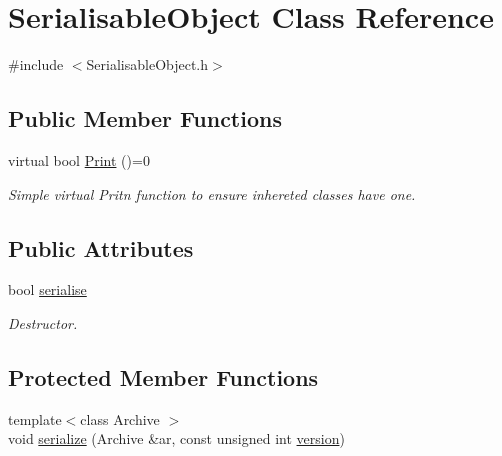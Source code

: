 \hypertarget{classSerialisableObject}{\section{Serialisable\-Object Class Reference}
\label{classSerialisableObject}
}


{\ttfamily \#include $<$Serialisable\-Object.\-h$>$}

\subsection*{Public Member Functions}
\begin{DoxyCompactItemize}
\item 
\hypertarget{classSerialisableObject_a9055c98969917d4c652eefdc924b6b75}{virtual bool \hyperlink{classSerialisableObject_a9055c98969917d4c652eefdc924b6b75}{Print} ()=0}\label{classSerialisableObject_a9055c98969917d4c652eefdc924b6b75}

\begin{DoxyCompactList}\small\item\em Simple virtual Pritn function to ensure inhereted classes have one. \end{DoxyCompactList}\end{DoxyCompactItemize}
\subsection*{Public Attributes}
\begin{DoxyCompactItemize}
\item 
bool \hyperlink{classSerialisableObject_a4635f9e80623df463bcca2c88b10fc67}{serialise}
\begin{DoxyCompactList}\small\item\em Destructor. \end{DoxyCompactList}\end{DoxyCompactItemize}
\subsection*{Protected Member Functions}
\begin{DoxyCompactItemize}
\item 
{\footnotesize template$<$class Archive $>$ }\\void \hyperlink{classSerialisableObject_a7c9ec7bf87b5921957768f4467c6143a}{serialize} (Archive \&ar, const unsigned int \hyperlink{classSerialisableObject_ade0071c238a09193b37a2750d2b50b18}{version})
\end{DoxyCompactItemize}
